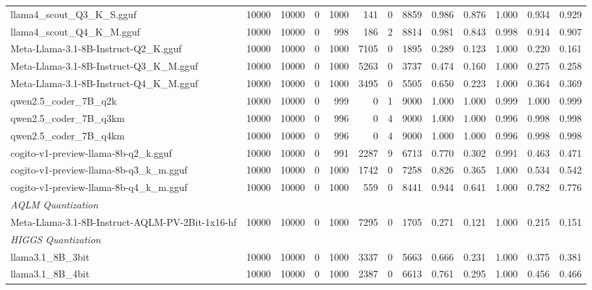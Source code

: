 \begin{table}[htbp]
{\begin{tabular}{lrrrrrrrrrrrr}
    llama4\_scout\_Q3\_K\_S.gguf & 10000 & 10000 & 0 & 1000 & 141 & 0 & 8859 & 0.986 & 0.876 & 1.000 & 0.934 & 0.929 \\
    llama4\_scout\_Q4\_K\_M.gguf & 10000 & 10000 & 0 & 998 & 186 & 2 & 8814 & 0.981 & 0.843 & 0.998 & 0.914 & 0.907 \\
    Meta-Llama-3.1-8B-Instruct-Q2\_K.gguf & 10000 & 10000 & 0 & 1000 & 7105 & 0 & 1895 & 0.289 & 0.123 & 1.000 & 0.220 & 0.161 \\
    Meta-Llama-3.1-8B-Instruct-Q3\_K\_M.gguf & 10000 & 10000 & 0 & 1000 & 5263 & 0 & 3737 & 0.474 & 0.160 & 1.000 & 0.275 & 0.258 \\
    Meta-Llama-3.1-8B-Instruct-Q4\_K\_M.gguf & 10000 & 10000 & 0 & 1000 & 3495 & 0 & 5505 & 0.650 & 0.223 & 1.000 & 0.364 & 0.369 \\
    qwen2.5\_coder\_7B\_q2k & 10000 & 10000 & 0 & 999 & 0 & 1 & 9000 & 1.000 & 1.000 & 0.999 & 1.000 & \cellcolor{green!50}0.999 \\
    qwen2.5\_coder\_7B\_q3km & 10000 & 10000 & 0 & 996 & 0 & 4 & 9000 & 1.000 & 1.000 & 0.996 & 0.998 & \cellcolor{green!30}0.998 \\
    qwen2.5\_coder\_7B\_q4km & 10000 & 10000 & 0 & 996 & 0 & 4 & 9000 & 1.000 & 1.000 & 0.996 & 0.998 & \cellcolor{green!20}0.998 \\
    cogito-v1-preview-llama-8b-q2\_k.gguf & 10000 & 10000 & 0 & 991 & 2287 & 9 & 6713 & 0.770 & 0.302 & 0.991 & 0.463 & 0.471 \\
    cogito-v1-preview-llama-8b-q3\_k\_m.gguf & 10000 & 10000 & 0 & 1000 & 1742 & 0 & 7258 & 0.826 & 0.365 & 1.000 & 0.534 & 0.542 \\
    cogito-v1-preview-llama-8b-q4\_k\_m.gguf & 10000 & 10000 & 0 & 1000 & 559 & 0 & 8441 & 0.944 & 0.641 & 1.000 & 0.782 & 0.776 \\
    \midrule
    \multicolumn{13}{l}{\textit{AQLM Quantization}} \\
    \midrule
    Meta-Llama-3.1-8B-Instruct-AQLM-PV-2Bit-1x16-hf & 10000 & 10000 & 0 & 1000 & 7295 & 0 & 1705 & 0.271 & 0.121 & 1.000 & 0.215 & 0.151 \\
    \midrule
    \multicolumn{13}{l}{\textit{HIGGS Quantization}} \\
    \midrule
    llama3.1\_8B\_3bit & 10000 & 10000 & 0 & 1000 & 3337 & 0 & 5663 & 0.666 & 0.231 & 1.000 & 0.375 & 0.381 \\
    llama3.1\_8B\_4bit & 10000 & 10000 & 0 & 1000 & 2387 & 0 & 6613 & 0.761 & 0.295 & 1.000 & 0.456 & 0.466 \\
    \midrule

\end{tabular}}
\end{table}
